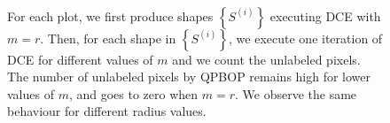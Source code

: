 \documentclass[runningheads]{llncs}
\begin{document}
\begin{figure}[!htp]
\begin{minipage}[b]{0.5\textwidth}
\\%
%
\end{minipage}
\caption{For each plot, we first produce shapes $\left\{ S^{(i)} \right\}$ executing DCE with $m=r$. Then, for each shape in $\left\{ S^{(i)} \right\}$, we execute one iteration of DCE for different values of $m$ and we count the unlabeled pixels. The number of unlabeled pixels by QPBOP remains high for lower values of $m$, and goes to zero when $m=r$. We observe the same behaviour for different radius values.}
\label{fig:unlabeled-versus-iterations}
\end{figure}
\end{document}
